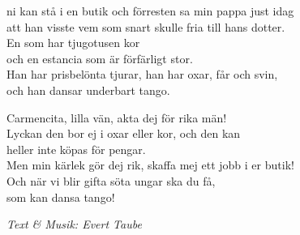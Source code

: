 ni kan stå i en butik och förresten sa min pappa just idag\\
att han visste vem som snart skulle fria till hans dotter.\\
En som har tjugotusen kor\\
och en estancia som är förfärligt stor.\\
Han har prisbelönta tjurar, han har oxar, får och svin,\\
och han dansar underbart tango.\par
\vspace{10pt}
Carmencita, lilla vän, akta dej för rika män!\\
Lyckan den bor ej i oxar eller kor, och den kan\\
heller inte köpas för pengar.\\
Men min kärlek gör dej rik, skaffa mej ett jobb i er butik!\\
Och när vi blir gifta söta ungar ska du få,\\
som kan dansa tango!
\par
\vspace{10pt}
{\footnotesize\textit{Text \& Musik: Evert Taube}}
